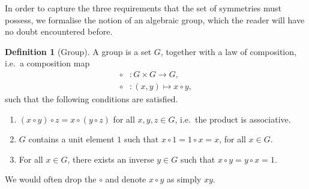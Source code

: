 \documentclass[a4 paper, 12pt]{book}
\theoremstyle{definition}
\newtheorem{definition}[theorem]{Definition}
\begin{document}
	In order to capture the three requirements that the set of symmetries must possess, we formalise the notion of an algebraic group, which the reader will have no doubt encountered before.
	\begin{definition}[Group]
	    A group is a set \(G\), together with a law of composition, i.e.\ a composition map
		\begin{align*}
		    \circ &\colon G \times G \rightarrow G,\\
			\circ &\colon (x, y) \mapsto x \circ y,
		\end{align*}
		such that the following conditions are satisfied.
		\begin{enumerate}
		    \item \((x\circ y) \circ z = x\circ (y \circ z)\) for all \(x, y, z \in G\), i.e.\ the product is associative.
			\item \(G\) contains a unit element \(1\) such that \(x \circ 1 = 1 \circ x = x\), for all \(x \in G\).
			\item For all \(x\in G\), there exists an inverse \(y \in G\) such that \(x \circ y = y \circ x = 1\).
		\end{enumerate}
	\end{definition}
	\noindent We would often drop the \(\circ\) and denote \(x\circ y\) as simply \(xy\).
\end{document}
